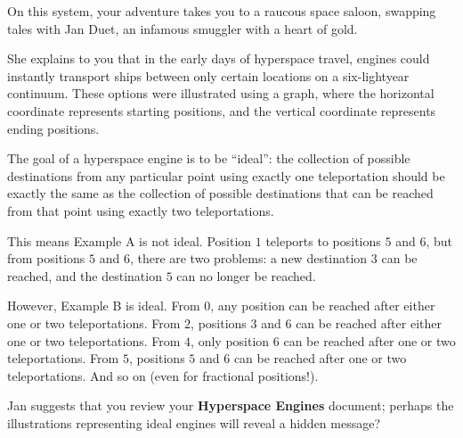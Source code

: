 On this system, your adventure takes you to a raucous space saloon, swapping tales
with Jan Duet, an infamous smuggler with a heart of gold.

She explains to you that in the early days of hyperspace travel, engines could
instantly transport ships between only certain locations on a six-lightyear continuum.
These options were illustrated using a graph, where the horizontal coordinate
represents starting positions, and the vertical coordinate represents ending positions.


The goal of a hyperspace engine is to be ``ideal'': the collection of possible
destinations from any particular point using exactly one teleportation should be exactly the 
same as the collection of possible destinations that can
be reached from that point using exactly two teleportations.

This means Example A is not ideal. Position \(1\) teleports to
positions \(5\) and \(6\), but from positions \(5\) and \(6\), there are two
problems: a new destination \(3\) can be reached, and the destination \(5\) can
no longer be reached.

However, Example B is ideal. From \(0\), any position can be reached after either
one or two teleportations. From \(2\), positions \(3\) and \(6\) can be reached
after either one or two teleportations. From \(4\), only position \(6\) can be reached
after one or two teleportations. From \(5\), positions \(5\) and \(6\) can be
reached after one or two teleportations. And so on (even for fractional positions!).

Jan suggests that you review your \textbf{Hyperspace Engines} document;
perhaps the illustrations representing ideal engines will reveal a hidden message?

